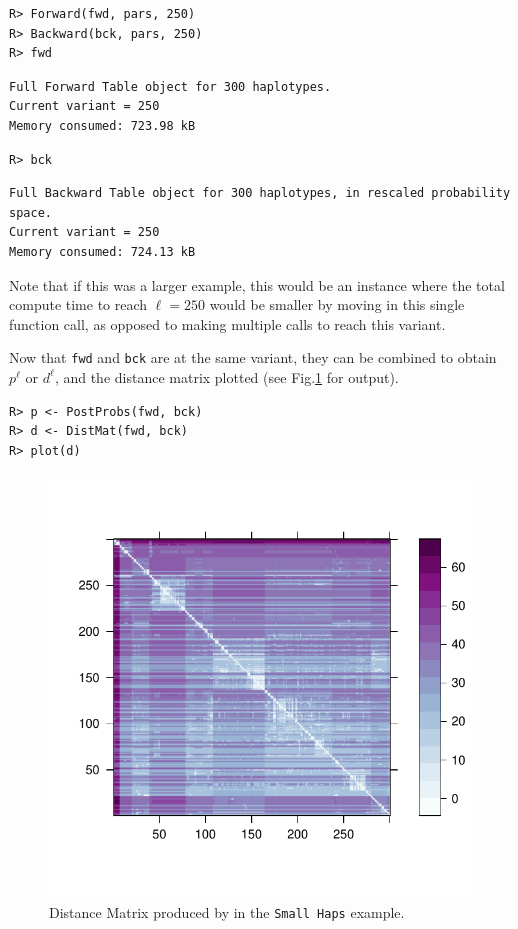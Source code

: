 \documentclass[a4paper]{article}
\begin{document}
\begin{verbatim}
R> Forward(fwd, pars, 250)
R> Backward(bck, pars, 250)
R> fwd
\end{verbatim}
\begin{verbatim}
Full Forward Table object for 300 haplotypes.
Current variant = 250
Memory consumed: 723.98 kB
\end{verbatim}
\begin{verbatim}
R> bck
\end{verbatim}
\begin{verbatim}
Full Backward Table object for 300 haplotypes, in rescaled probability space.
Current variant = 250
Memory consumed: 724.13 kB
\end{verbatim}

Note that if this was a larger example, this would be an instance where the total compute time to reach \(\ell=250\) would be smaller by moving in this single function call, as opposed to making multiple calls to reach this variant.

Now that \texttt{fwd} and \texttt{bck} are at the same variant, they can be combined to obtain \(p^\ell\) or \(d^\ell\), and the distance matrix plotted (see Fig.\ref{fig:dist_mat_example} for output).

\begin{verbatim}
R> p <- PostProbs(fwd, bck)
R> d <- DistMat(fwd, bck)
R> plot(d)
\end{verbatim}

\begin{figure}
  \centering
  \includegraphics{fig}
	\caption{Distance Matrix produced by in the \texttt{Small Haps} example.}
	\label{fig:dist_mat_example}
\end{figure}
\end{document}
